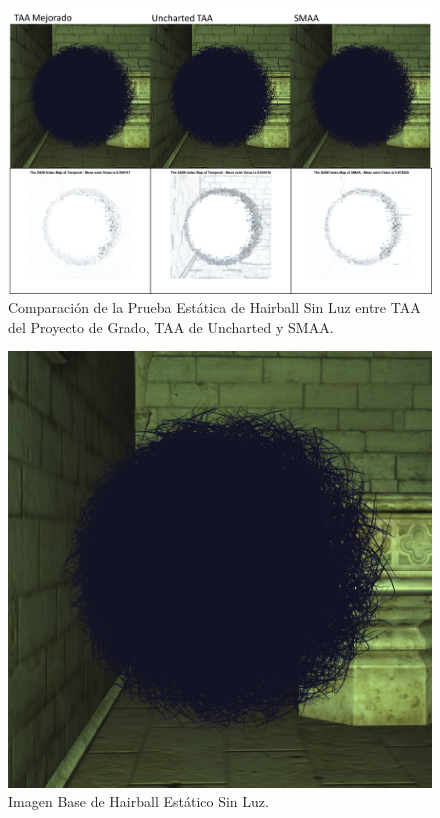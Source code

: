 \documentclass[pregrado]{tesis-usb} %
\begin{document}
\begin{figure}[!htb]
	\centering
	\includegraphics[scale=0.3]{images/results/hairball_static_shadow.png}
	\caption{Comparación de la Prueba Estática de Hairball Sin Luz entre TAA del Proyecto de Grado, TAA de Uncharted y SMAA.}\label{fig:hairball_static_shadow_render}
\end{figure}

\begin{figure}[!htb]
	\centering
	\includegraphics[scale=0.2]{images/results/hairball_sobel_ground_truth.png}
	\caption{Imagen Base de Hairball Estático Sin Luz.}\label{fig:hairball_static_shadow_truth}
\end{figure}
\end{document}
